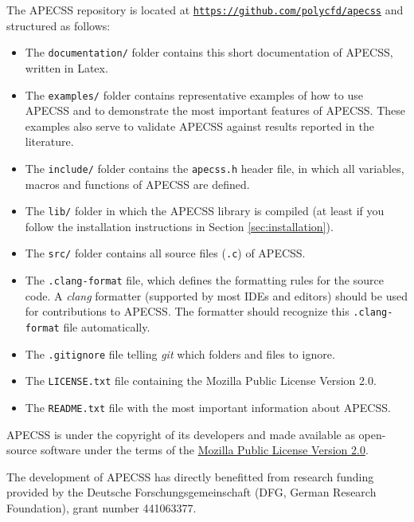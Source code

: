 The APECSS repository is located at \href{https://github.com/polycfd/apecss}{\texttt{https://github.com/polycfd/apecss}} and structured as follows:\vspace{-1em}
\begin{itemize}[noitemsep]
    \item The {\tt documentation/} folder contains this short documentation of APECSS, written in Latex.
    \item The {\tt examples/} folder contains representative examples of how to use APECSS and to demonstrate the most important features of APECSS. These examples also serve to validate APECSS against results reported in the literature.
    \item The {\tt include/} folder contains the {\tt apecss.h} header file, in which all variables, macros and functions of APECSS are defined.
    \item The {\tt lib/} folder in which the APECSS library is compiled (at least if you follow the installation instructions in Section \ref{sec:installation}).
    \item The {\tt src/} folder contains all source files ({\tt *.c}) of APECSS.
    \item The {\tt .clang-format} file, which defines the formatting rules for the source code. A \textit{clang} formatter (supported by most IDEs and editors) should be used for contributions to APECSS. The formatter should recognize this {\tt .clang-format} file automatically.
    \item The {\tt .gitignore} file telling \textit{git} which folders and files to ignore.
    \item The {\tt LICENSE.txt} file containing the Mozilla Public License Version 2.0.
    \item The {\tt README.txt} file with the most important information about APECSS.
\end{itemize}

APECSS is under the copyright of its developers and made available as open-source software under the terms of the \href{https://www.mozilla.org/en-US/MPL/2.0/}{Mozilla Public License Version 2.0}.

The development of APECSS has directly benefitted from research funding provided by the Deutsche Forschungsgemeinschaft (DFG, German Research Foundation), grant number 441063377.
